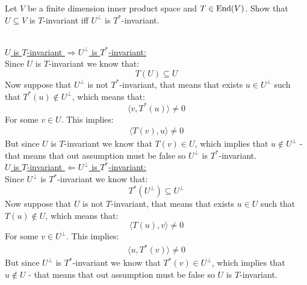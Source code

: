 \documentclass[11pt, a4paper]{article}
\begin{document}
\begin{exercise}
  Let $V$ be a finite dimension inner product space and $T\in\operatorname{End}(V)$. 
  Show that $U\subseteq V$ is $T$-invariant iff $U^\bot$ is
  $T^*$-invariant.
\end{exercise}
\begin{solution} \phantom{} \\
  \underline{$U$ is $T$-invariant $\Rightarrow U^\bot$ is $T^*$-invariant:} \\ 
  Since $U$ is $T$-invariant we know that:
  \[
    T(U) \subseteq U
  \]
  Now suppose that $U^\bot$ is not $T^*$-invariant, that means that exists
  $u\in U^\bot$ such that $T^*(u)\notin U^\bot$, which means that:
  \[
    \langle v, T^*(u)\rangle \neq 0
  \]
  For some $v\in U$. This implies:
  \begin{align*}
    \langle T(v), u \rangle \neq 0
  \end{align*}
  But since $U$ is $T$-invariant we know that $T(v)\in U$, which implies
  that $u\notin U^\bot$ - that means that out assumption must be false
  so $U^\bot$ is $T^*$-invariant. \\
  \underline{$U$ is $T$-invariant $\Leftarrow U^\bot$ is $T^*$-invariant:} \\ 
  Since $U^\bot$ is $T^*$-invariant we know that:
  \[
    T^*(U^\bot) \subseteq U^\bot
  \]
  Now suppose that $U$ is not $T$-invariant, that means that exists
  $u\in U$ such that $T(u)\notin U$, which means that:
  \[
    \langle T(u), v\rangle \neq 0
  \]
  For some $v\in U^\bot$. This implies:
  \begin{align*}
    \langle u, T^*(v) \rangle \neq 0
  \end{align*}
  But since $U^\bot$ is $T^*$-invariant we know that $T^*(v)\in U^\bot$, 
  which implies that $u\notin U$ - that means that out assumption must be
  false so $U$ is $T$-invariant.
\end{solution}
\end{document}
